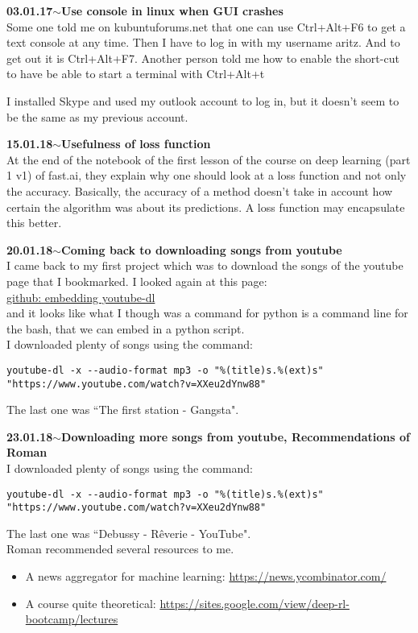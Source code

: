 \documentclass[11pt,a4paper]{article}
\newenvironment{loggentry}[2]%
{\noindent\textbf{#1}\hspace{1cm}$\mathbf{\sim}$\text{ }\textbf{#2}\\}{\vspace{0.5cm}}
\begin{document}
\begin{loggentry}{03.01.17}{Use console in linux when GUI crashes}
Some one told me on kubuntuforums.net that one can use Ctrl+Alt+F6 to get a text console at any time. Then I have to log in with my username aritz. And to get out it is Ctrl+Alt+F7. Another person told me how to enable the short-cut to have be able to start a terminal with Ctrl+Alt+t

I installed Skype and used my outlook account to log in, but it doesn't seem to be the same as my previous account.
\end{loggentry}

\begin{loggentry}{15.01.18}{Usefulness of loss function}
At the end of the notebook of the first lesson of the course on deep learning (part 1 v1) of fast.ai, they explain why one should look at a loss function and not only the accuracy. Basically, the accuracy of a method  doesn't take in account how certain the algorithm was about its predictions. A loss function may encapsulate this better.
\end{loggentry}

\begin{loggentry}{20.01.18}{Coming back to downloading songs from youtube}
I came back to my first project which was to download the songs of the youtube page that I bookmarked. I looked again at this page:\\
\href{https://github.com/rg3/youtube-dl/blob/master/README.md#embedding-youtube-dl}{github: embedding youtube-dl}\\
and it looks like what I though was a command for python is a command line for the bash, that we can embed in a python script.\\
I downloaded plenty of songs using the command:\\
\begin{verbatim}
youtube-dl -x --audio-format mp3 -o "%(title)s.%(ext)s" "https://www.youtube.com/watch?v=XXeu2dYnw88"
\end{verbatim}
The last one was ``The first station - Gangsta".
\end{loggentry}

\begin{loggentry}{23.01.18}{Downloading more songs from youtube, Recommendations of Roman}
I downloaded plenty of songs using the command:\\
\begin{verbatim}
youtube-dl -x --audio-format mp3 -o "%(title)s.%(ext)s" "https://www.youtube.com/watch?v=XXeu2dYnw88"
\end{verbatim}
The last one was ``Debussy - Rêverie - YouTube".\\
Roman recommended several resources to me.
\begin{itemize}
\item A news aggregator for machine learning: \url{https://news.ycombinator.com/}
\item A course quite theoretical: \url{https://sites.google.com/view/deep-rl-bootcamp/lectures}
\end{itemize}
\end{loggentry}
\end{document}
